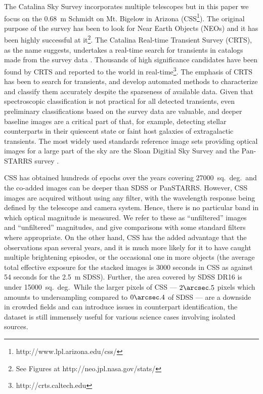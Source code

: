 \documentclass[fleqn,usenatbib]{mnras}
\newcommand{\sqd}{sq.~deg.}
\begin{document}
The Catalina Sky Survey incorporates multiple telescopes but in this paper we focus on the 0.68~m Schmidt on Mt. Bigelow in Arizona (CSS\footnote{http://www.lpl.arizona.edu/css/}).  The original purpose of the survey has been to look for Near Earth Objects (NEOs) and it has been highly successful at it\footnote{See Figures at http://neo.jpl.nasa.gov/stats/}. 
The Catalina Real-time Transient Survey (CRTS), as the name suggests, undertakes a real-time search for transients in catalogs made from the survey data \citep[etc]{Drake2009,Djorgovski2011,Mahabal2011}. Thousands of high significance candidates have been found by CRTS and reported to the world in real-time\footnote{http://crts.caltech.edu}. The emphasis of CRTS has been to search for transients, and develop automated methods to characterize and classify them accurately despite the sparseness of available data. 
Given that spectroscopic classification is not practical for all detected transients,  even preliminary classifications based on the survey data are valuable, and deeper baseline images are a critical part of that, for example,  detecting stellar counterparts in their quiescent state or faint host galaxies of extragalactic transients. The most widely used standards reference image sets providing optical images for a large part of the sky are the Sloan Digitial Sky Survey \citep[SDSS;][]{Albareti2016} and the Pan-STARRS survey \citep[PS1\footnote{https://panstarrs.stsci.edu/};][]{2016arXiv161205243F}. 

CSS has obtained hundreds of epochs over the years covering 27000~\sqd\ and the co-added images can be deeper than SDSS or PanSTARRS. 
However, CSS images are acquired without using any filter, with the wavelength response being defined by the telescope and camera system. Hence, there is no particular band in which optical magnitude is measured. We refer to these as ``unfiltered'' images and ``unfiltered'' magnitudes, and give comparisons with some standard filters where appropriate.
On the other hand, CSS has the added advantage that the observations span several years, and it is much more likely for it to have caught multiple brightening episodes, or the occasional one in more objects (the average total effective exposure for the stacked images is 3000 seconds in CSS as against 54 seconds for the 2.5~m SDSS).
Further, the area covered by SDSS DR16 is under 15000~\sqd\  
While the larger pixels of CSS --- $2\arcsec.5$ pixels which amounts to undersampling compared to $0\arcsec.4$ of SDSS --- are a downside in crowded fields and can introduce issues in counterpart identification, the dataset is still immensely useful for various science cases involving isolated sources.
\end{document}
